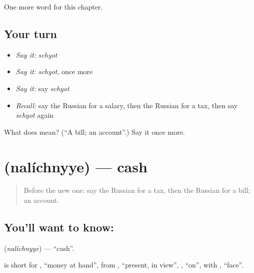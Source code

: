 \begin{grammarlens}[title={What you've built}]
One more word for this chapter.
\end{grammarlens}

\subsection*{Your turn}
\begin{itemize}
\raggedright
  \item \emph{Say it:} \emph{schyot}
  \item \emph{Say it:} \emph{schyot}, once more
  \item \emph{Say it:} say \emph{schyot}
  \item \emph{Recall:} say the Russian for a salary, then the Russian for a tax, then say \emph{schyot} again
\end{itemize}

\begin{tcolorbox}[breakable,colback=teal!4,colframe=teal!35!black,title={Before you move on}]
What does  mean? (\textquotedblleft{}A bill; an account\textquotedblright{}.) Say it once more.
\end{tcolorbox}
\section[\texorpdfstring{\ru{наличные} (nalíchnyye)}{наличные (nalíchnyye)}]{ (nalíchnyye) — cash}

\label{lesson:RU-C170-nalichnyye}



\begin{quote}
Before the new one: say the Russian for a tax, then the Russian for a bill; an account.
\end{quote}

\subsection*{You'll want to know: }
\textbf{} (\emph{nalíchnyye}) — \textquotedblleft{}cash\textquotedblright{}.

\begin{cousinweb}
\textbf{} is short for \emph{ }, \textquotedblleft{}money at hand\textquotedblright{}, from \emph{}, \textquotedblleft{}present, in view\textquotedblright{}, \emph{}, \textquotedblleft{}on\textquotedblright{}, with \emph{}, \textquotedblleft{}face\textquotedblright{}.
\end{cousinweb}

